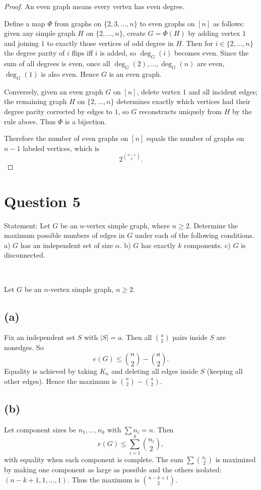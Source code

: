 \documentclass[11pt]{article}
\begin{document}
\begin{proof}
    An even graph means every vertex has even degree.

Define a map $\Phi$ from graphs on $\{2,3,\dots,n\}$ to even graphs on $[n]$ as follows:
given any simple graph $H$ on $\{2,\dots,n\}$, create $G=\Phi(H)$ by adding vertex $1$ and joining $1$ to
exactly those vertices of odd degree in $H$. Then for $i\in\{2,\dots,n\}$ the degree parity of $i$ flips
iff $i$ is added, so $\deg_G(i)$ becomes even. Since the sum of all degrees is even, once all
$\deg_G(2),\dots,\deg_G(n)$ are even, $\deg_G(1)$ is also even. Hence $G$ is an even graph.

Conversely, given an even graph $G$ on $[n]$, delete vertex $1$ and all incident edges; the remaining graph
$H$ on $\{2,\dots,n\}$ determines exactly which vertices had their degree parity corrected by edges to $1$,
so $G$ reconstructs uniquely from $H$ by the rule above. Thus $\Phi$ is a bijection.

Therefore the number of even graphs on $[n]$ equals the number of graphs on $n-1$ labeled vertices, which is
\[
\boxed{2^{\binom{n-1}{2}}.}
\]
\end{proof}

\newpage

\section*{Question 5}

Statement: Let $G$ be an $n$-vertex simple graph, where $n\ge 2$. Determine the maximum possible numbers of edges in $G$ under each of the following conditions. a) $G$ has an independent set of size $\alpha$. b) $G$ has exactly $k$ components. c) $G$ is disconnected.

~

Let $G$ be an $n$-vertex simple graph, $n\ge 2$.

\subsection*{(a)}
Fix an independent set $S$ with $|S|=a$. Then all $\binom{a}{2}$ pairs inside $S$ are nonedges.
So
\[
e(G)\le \binom{n}{2}-\binom{a}{2}.
\]
Equality is achieved by taking $K_n$ and deleting all edges inside $S$ (keeping all other edges).
Hence the maximum is $\boxed{\binom{n}{2}-\binom{a}{2}}$.

\subsection*{(b)}
Let component sizes be $n_1,\dots,n_k$ with $\sum n_i=n$. Then
\[
e(G)\le \sum_{i=1}^k \binom{n_i}{2},
\]
with equality when each component is complete. The sum $\sum \binom{n_i}{2}$ is maximized by making one
component as large as possible and the others isolated: $(n-k+1,1,\dots,1)$.
Thus the maximum is $\boxed{\binom{n-k+1}{2}}$.
\end{document}
